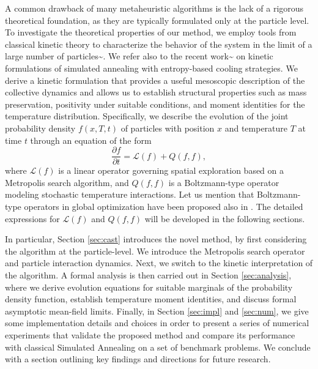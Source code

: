 \documentclass[10pt,a4paper]{article}
\theoremstyle{theorem}
\numberwithin{equation}{section}
\begin{document}
A common drawback of many metaheuristic algorithms is the lack of a rigorous theoretical foundation, as they are typically formulated only at the particle level. To investigate the theoretical properties of our method, we employ tools from classical kinetic theory to characterize the behavior of the system in the limit of a large number of particles^^>\cite{pareschi_optimization_2024, borghi_kinetic_2024, pareschi_interacting_2014,albi_vehicular_2019}. We refer also to the recent work^^>\cite{herty_kinetic_2026} on kinetic formulations of simulated annealing with entropy-based cooling strategies. 
We derive a kinetic formulation that provides a useful mesoscopic description of 
the collective dynamics and allows us to establish structural properties such as 
mass preservation, positivity under suitable conditions, and moment identities for 
the temperature distribution. Specifically, we describe the evolution of the joint probability density $f(x,T,t)$ of particles with position $x$ and temperature $T$ at time $t$ through an equation of the form
\begin{equation}
\label{eq:SAPTstrong}
\frac{\partial f}{\partial t} = \mathcal{L}(f) + Q(f,f),
\end{equation}
where $\mathcal{L}(f)$ is a linear operator governing spatial exploration based on a Metropolis search algorithm, and $Q(f,f)$ is a Boltzmann-type  operator modeling stochastic temperature interactions. Let us mention that Boltzmann-type operators in global optimization have been proposed also in \cite{benfenati_binary_2022,albi_kinetic_2023,borghi_kinetic_2025}.
The detailed expressions for $\mathcal{L}(f)$ and $Q(f,f)$ will be developed in the following sections. 

In particular, Section \ref{sec:cast} introduces the novel method, by first considering the algorithm at the particle-level. We introduce the Metropolis search operator and particle interaction dynamics. Next, we switch to the kinetic interpretation of the algorithm. 
A formal analysis is then carried out in Section \ref{sec:analysis}, where we derive evolution 
equations for suitable marginals of the probability density function, establish 
temperature moment identities, and discuss formal asymptotic mean-field  
limits. Finally, in Section \ref{sec:impl} and \ref{sec:num}, we give some implementation details and choices in order to present a series of numerical experiments that validate the proposed method and compare its performance with classical Simulated Annealing on a set of benchmark problems. We conclude with a section outlining key findings and directions for future research.
\end{document}

